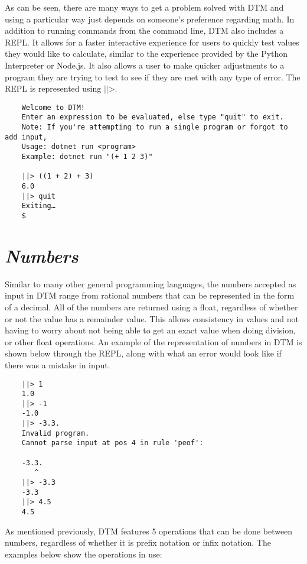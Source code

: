 \documentclass[10pt]{article}
\begin{document}
As can be seen, there are many ways to get a problem solved with DTM and using a particular way just depends on someone's preference regarding math. In addition to running commands from the command line, DTM also includes a REPL. It allows for a faster interactive experience for users to quickly test values they would like to calculate, similar to the experience provided by the Python Interpreter or Node.js. It also allows a user to make quicker adjustments to a program they are trying to test to see if they are met with any type of error. The REPL is represented using $\texttt{||>}$.

\begin{verbatim}
    Welcome to DTM!
    Enter an expression to be evaluated, else type "quit" to exit.
    Note: If you're attempting to run a single program or forgot to add input, 
    Usage: dotnet run <program> 
    Example: dotnet run "(+ 1 2 3)"
    
    ||> ((1 + 2) + 3)
    6.0
    ||> quit
    Exiting…
    $
\end{verbatim}

\section{\textit{Numbers}}

Similar to many other general programming languages, the numbers accepted as input in DTM range from rational numbers that can be represented in the form of a decimal. All of the numbers are returned using a float, regardless of whether or not the value has a remainder value. This allows consistency in values and not having to worry about not being able to get an exact value when doing division, or other float operations. An example of the representation of numbers in DTM is shown below through the REPL, along with what an error would look like if there was a mistake in input. 

\begin{verbatim}
    ||> 1 
    1.0
    ||> -1
    -1.0
    ||> -3.3.
    Invalid program.
    Cannot parse input at pos 4 in rule 'peof':
    
    -3.3.
       ^
    ||> -3.3
    -3.3
    ||> 4.5
    4.5
\end{verbatim}

As mentioned previously, DTM features 5 operations that can be done between numbers, regardless of whether it is prefix notation or infix notation. The examples below show the operations in use:
\end{document}
